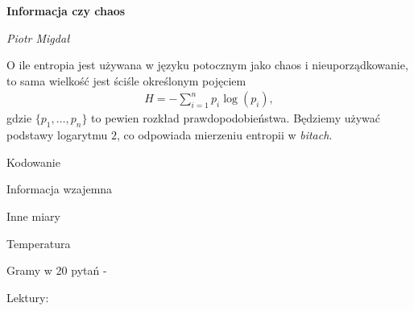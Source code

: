 \documentclass[10pt,a4paper]{article}
\begin{document}
\noindent\textbf{\LARGE Informacja czy chaos}

\medskip
\noindent\textit{\Large Piotr Migdał} 

\medskip

O ile entropia jest używana w języku potocznym jako chaos i nieuporządkowanie, to sama wielkość jest ściśle określonym pojęciem
%
\begin{align}
    H = -\sum_{i=1}^{n} p_i \log(p_i),
\end{align}
%
gdzie $\{p_1, \ldots, p_n\}$ to pewien rozkład prawdopodobieństwa. Będziemy używać podstawy logarytmu $2$, co odpowiada mierzeniu entropii w \emph{bitach}. 


Kodowanie 


Informacja wzajemna

Inne miary 

Temperatura




Gramy w 20 pytań - 




 Lektury:
\end{document}
